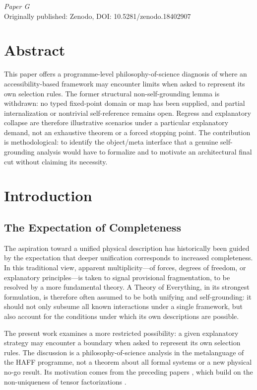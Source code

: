 \documentclass[12pt,a4paper,openany]{book}
\begin{document}
\begin{center}
\textit{Paper G}\\[0.5em]
Originally published: Zenodo, DOI: 10.5281/zenodo.18402907
\end{center}

\bigskip

\section*{Abstract}
This paper offers a programme-level philosophy-of-science diagnosis of where an accessibility-based framework may encounter limits when asked to represent its own selection rules. The former structural non-self-grounding lemma is withdrawn: no typed fixed-point domain or map has been supplied, and partial internalization or nontrivial self-reference remains open. Regress and explanatory collapse are therefore illustrative scenarios under a particular explanatory demand, not an exhaustive theorem or a forced stopping point. The contribution is methodological: to identify the object/meta interface that a genuine self-grounding analysis would have to formalize and to motivate an architectural final cut without claiming its necessity.


\section{Introduction}
\label{H-G-sec:intro}

\subsection{The Expectation of Completeness}

The aspiration toward a unified physical description has historically been guided by the expectation that deeper unification corresponds to increased completeness. In this traditional view, apparent multiplicity---of forces, degrees of freedom, or explanatory principles---is taken to signal provisional fragmentation, to be resolved by a more fundamental theory. A Theory of Everything, in its strongest formulation, is therefore often assumed to be both unifying and self-grounding: it should not only subsume all known interactions under a single framework, but also account for the conditions under which its own descriptions are possible.

The present work examines a more restricted possibility: a given explanatory strategy may encounter a boundary when asked to represent its own selection rules.  The discussion is a philosophy-of-science analysis in the metalanguage of the HAFF programme, not a theorem about all formal systems or a new physical no-go result.  Its motivation comes from the preceding papers \cite{Liu2026PaperA,Liu2026PaperB,Liu2026PaperC,Liu2026PaperD,Liu2026PaperE,Liu2026PaperF}, which build on the non-uniqueness of tensor factorizations \cite{Zanardi2001,Zanardi2004}.
\end{document}
